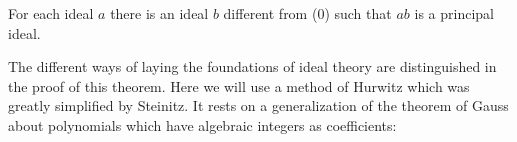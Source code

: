 For each ideal $a$ there is an ideal $b$ different from (0) such that $ab$ is a principal ideal.

The different ways of laying the foundations of ideal theory are distinguished in the proof of this theorem. Here we will use a method of Hurwitz which was greatly simplified by Steinitz. It rests on a generalization of the theorem of Gauss about polynomials which have algebraic integers as coefficients:
